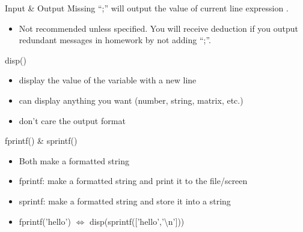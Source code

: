 \begin{frame}{Input \& Output}
Missing ``;'' will output the value of current line expression .
\begin{itemize}
	\item Not recommended unless specified. You will receive deduction if you output redundant messages in homework by not adding ``;''.
\end{itemize}
\begin{block}{disp()}
	\begin{itemize}
		\item display the value of the variable with a new line
		\item can display anything you want (number, string, matrix, etc.)
		\item don't care the output format
	\end{itemize}
\end{block}
\begin{block}{fprintf() \& sprintf()}
	\begin{itemize}
		\item Both make a formatted string
		\item fprintf: make a formatted string and print it to the file/screen
		\item sprintf: make a formatted string and store it into a string
		\item fprintf('hello') $\Leftrightarrow$ disp(sprintf(['hello','\textbackslash n']))
	\end{itemize}
\end{block}
\end{frame}